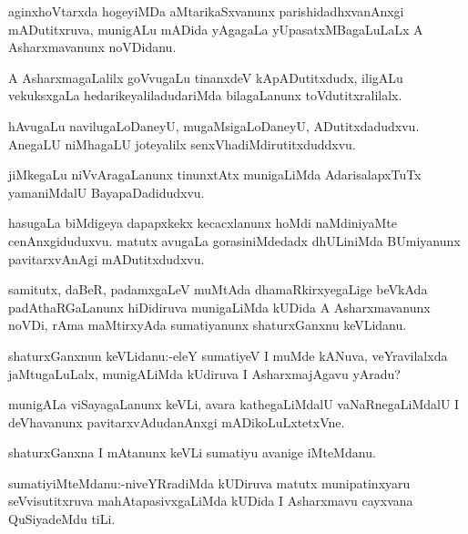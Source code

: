 \documentclass{article}
\begin{document}
\begin{mn}%
aginxhoVtarxda hogeyiMDa aMtarikaSxvanunx parishidadhxvanAnxgi mADutitxruva, munigALu 
mADida yAgagaLa yUpasatxMBagaLuLaLx A Asharxmavanunx noVDidanu.
\end{mn}

\begin{mn}%
A AsharxmagaLalilx goVvugaLu tinanxdeV kApADutitxdudx, iligALu vekuksxgaLa 
hedarikeyaliladudariMda bilagaLanunx toVdutitxralilalx.
\end{mn}

\begin{mn}%
hAvugaLu navilugaLoDaneyU, mugaMsigaLoDaneyU, ADutitxdadudxvu. AnegaLU niMhagaLU 
joteyalilx senxVhadiMdirutitxduddxvu.
\end{mn}

\begin{mn}%
jiMkegaLu niVvAragaLanunx tinunxtAtx munigaLiMda AdarisalapxTuTx yamaniMdalU 
BayapaDadidudxvu.
\end{mn}

\begin{mn}%
hasugaLa biMdigeya dapapxkekx kecacxlanunx hoMdi naMdiniyaMte cenAnxgiduduxvu. matutx 
avugaLa gorasiniMdedadx dhULiniMda BUmiyanunx pavitarxvAnAgi mADutitxdudxvu.
\end{mn}

\begin{mn}%
samitutx, daBeR, padamxgaLeV muMtAda dhamaRkirxyegaLige beVkAda padAthaRGaLanunx 
hiDidiruva munigaLiMda kUDida A Asharxmavanunx noVDi, rAma maMtirxyAda sumatiyanunx 
shaturxGanxnu keVLidanu.
\end{mn}

\begin{mn}%
shaturxGanxnun keVLidanu:-eleY sumatiyeV I muMde kANuva, veYravilalxda jaMtugaLuLalx, 
munigALiMda kUdiruva I AsharxmajAgavu yAradu?
\end{mn}

\begin{mn}%
munigALa viSayagaLanunx keVLi, avara kathegaLiMdalU vaNaRnegaLiMdalU I deVhavanunx 
pavitarxvAdudanAnxgi mADikoLuLxtetxVne.
\end{mn}

\begin{mn}%
shaturxGanxna I mAtanunx keVLi sumatiyu avanige iMteMdanu.
\end{mn}

\begin{mn}%
sumatiyiMteMdanu:-niveYRradiMda kUDiruva matutx munipatinxyaru seVvisutitxruva 
mahAtapasivxgaLiMda kUDida I Asharxmavu cayxvana QuSiyadeMdu tiLi.
\end{mn}
\end{document}
